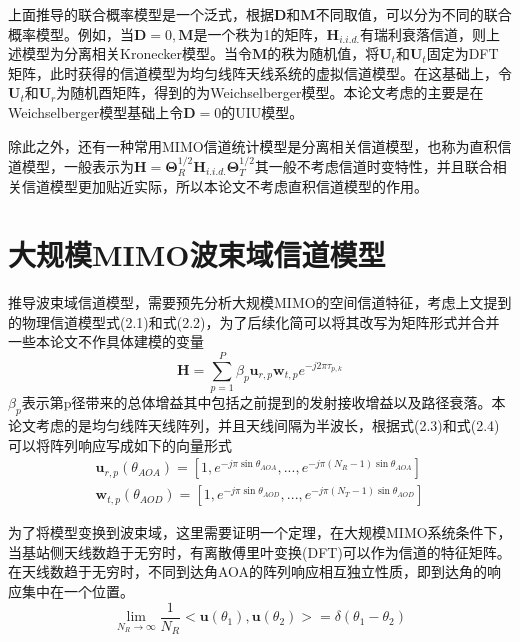 \documentclass[bachelor,nocolorlinks, printoneside]{seuthesis} %
\begin{document}
\begin{Main}
上面推导的联合概率模型是一个泛式，根据$ \mathbf{D}$和$\mathbf{M}$不同取值，可以分为不同的联合概率模型。例如，当$\mathbf{D}=0,\mathbf{M}$是一个秩为1的矩阵，$\mathbf{H}_{i.i.d.}$有瑞利衰落信道，则上述模型为分离相关Kronecker模型。当令$\mathbf{M}$的秩为随机值，将$\mathbf{U}_t$和$\mathbf{U}_t$固定为DFT矩阵，此时获得的信道模型为均匀线阵天线系统的虚拟信道模型。在这基础上，令$\mathbf{U}_t$和$\mathbf{U}_r$为随机酉矩阵，得到的为Weichselberger模型。本论文考虑的主要是在Weichselberger模型基础上令$ \mathbf{D} = 0 $的UIU模型。

除此之外，还有一种常用MIMO信道统计模型是分离相关信道模型，也称为直积信道模型，一般表示为$ \mathbf{H} = \bm{\Theta}_R^{1/2} \mathbf{H}_{i.i.d.} \bm{\Theta}_T^{1/2}$其一般不考虑信道时变特性，并且联合相关信道模型更加贴近实际，所以本论文不考虑直积信道模型的作用。

\section{大规模MIMO波束域信道模型}
推导波束域信道模型，需要预先分析大规模MIMO的空间信道特征\cite{SunchenBD}\cite{Youli2}，考虑上文提到的物理信道模型式(2.1)和式(2.2)，为了后续化简可以将其改写为矩阵形式并合并一些本论文不作具体建模的变量
\begin{equation}\label{key}
\mathbf{H} = \sum_{p=1}^{P}\beta_p \mathbf{u}_{r,p}\mathbf{w}_{t,p}e^{-j2\pi \tau_{p,k}}
\end{equation}
$\beta_p$表示第p径带来的总体增益其中包括之前提到的发射接收增益以及路径衰落。本论文考虑的是均匀线阵天线阵列，并且天线间隔为半波长，根据式(2.3)和式(2.4)可以将阵列响应写成如下的向量形式
\begin{eqnarray}\label{key}
\mathbf{u}_{r,p}(\theta_{AOA}) = [1,e^{-j\pi \sin \theta_{AOA}},...,e^{-j\pi (N_R-1)\sin\theta_{AOA}}] \\
\mathbf{w}_{t,p}(\theta_{AOD}) = [1,e^{-j\pi \sin \theta_{AOD}},...,e^{-j\pi (N_T-1)\sin\theta_{AOD}}]
\end{eqnarray}

为了将模型变换到波束域，这里需要证明一个定理，在大规模MIMO系统条件下，当基站侧天线数趋于无穷时，有离散傅里叶变换(DFT)可以作为信道的特征矩阵。在天线数趋于无穷时，不同到达角AOA的阵列响应相互独立性质，即到达角的响应集中在一个位置。
\begin{equation}\label{key}
\lim_{N_R \rightarrow \infty}\frac{1}{N_R}<\mathbf{u}(\theta_1),\mathbf{u}(\theta_2)> = \delta(\theta_1 -\theta_2)
\end{equation}


\end{Main}
\end{document}
